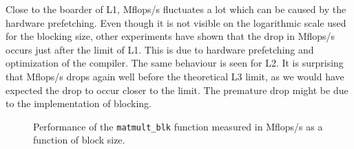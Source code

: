 Close to the boarder of L1, Mflops/s fluctuates a lot which can be caused by the hardware prefetching. Even though it is not visible on the logarithmic scale used for the blocking size, other experiments have shown that the drop in Mflops/s occurs just after the limit of L1. This is due to hardware prefetching and optimization of the compiler. The same behaviour is seen for L2. It is surprising that Mflops/s drops again well before the theoretical L3 limit, as we would have expected the drop to occur closer to the limit. The premature drop might be due to the implementation of blocking.

\begin{figure}[!th]
\centering
{}
\caption{Performance of the \texttt{matmult\_blk} function measured in Mflops/s as a function of block size.}
\label{fig:blk_opti}
\end{figure}
 


